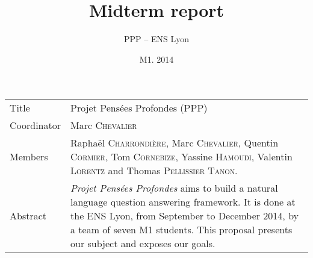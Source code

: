 \documentclass[a4paper,10pt]{article}
\title{Midterm report}
\author{PPP \--- ENS Lyon}
\date{M1. 2014}
\begin{document}
\maketitle

\newlength{\title}
\settowidth{\title}{Coordinator }

\newlength{\object}
\setlength{\object}{\textwidth} \addtolength{\object}{-\title} \addtolength{\object}{-6.8pt} 
    \addtolength{\object}{-2\tabcolsep}

\renewcommand{\arraystretch}{1.5}

\begin{center}
\begin{tabular}{@{}|p{\title}p{\object}@{}|}
\hline
Title & Projet Pensées Profondes (PPP)\\
Coordinator & Marc \textsc{Chevalier}\\
Members & Raphaël \textsc{Charrondière}, Marc \textsc{Chevalier}, Quentin 
      \textsc{Cormier}, Tom \textsc{Cornebize}, \linebreak Yassine \textsc{Hamoudi}, 
      Valentin \textsc{Lorentz} and Thomas \textsc{Pellissier} \textsc{Tanon}.\\
Abstract & \emph{Projet Pensées Profondes} aims to build a natural language question answering framework.
It is done at the ENS Lyon, from September to December 2014, by a team of seven M1 students. This proposal presents
our subject and exposes our goals.\\
\hline
\end{tabular}
\end{center}
\tableofcontents



















\nocite{*}
\end{document}
